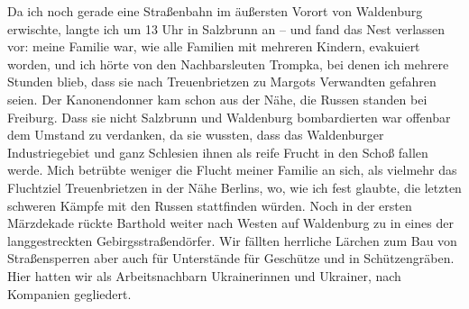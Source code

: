 \documentclass[a5paper,pagesize,10pt,twoside=true]{scrbook}
\renewcommand{\marginpar}[2][]{}
\begin{document}
Da ich noch gerade eine Straßenbahn im äußersten Vorort von Waldenburg erwischte, langte ich um 13 Uhr in Salzbrunn an -- und fand das Nest verlassen vor: meine Familie war, wie alle Familien mit mehreren Kindern, evakuiert worden, und ich hörte von den Nachbarsleuten Trompka, bei denen ich mehrere Stunden blieb, dass sie nach Treuenbrietzen zu Margots Verwandten gefahren seien. Der Kanonendonner kam schon aus der Nähe, die Russen standen bei Freiburg. Dass sie nicht Salzbrunn und Waldenburg bombardierten war offenbar dem Umstand zu verdanken, da sie wussten, dass das Waldenburger Industriegebiet und ganz Schlesien ihnen als reife Frucht in den Schoß fallen werde. Mich betrübte weniger die Flucht meiner Familie an sich, als vielmehr das Fluchtziel Treuenbrietzen in der Nähe Berlins, wo, wie ich fest glaubte, die letzten schweren Kämpfe mit den Russen stattfinden würden. Noch in der ersten Märzdekade rückte Barthold weiter nach Westen auf Waldenburg zu in eines der langgestreckten Gebirgsstraßendörfer. Wir fällten herrliche Lärchen zum Bau von Straßensperren aber auch für Unterstände für Geschütze und in Schützengräben. Hier hatten wir als Arbeitsnachbarn Ukrainerinnen und Ukrainer, nach Kompanien gegliedert.

\marginpar{Ende \enquote{Meine Lebenserinnerungen im Abriss} Heft 1 bis März 45}

\marginpar{Abschrift beendet 7.5.2021}

\marginpar{\enquote{Meine Lebenserinnerungen im Abriss}, Heft 2 ab März 1945 -- verfasst im Diakoniekrankenhaus ab Anfang Okt. 1976}
\end{document}
